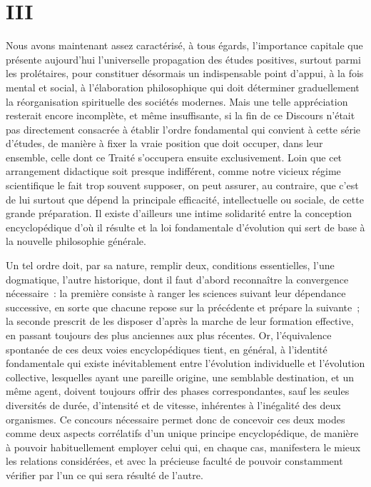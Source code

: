 \documentclass[french,twoside]{book} %
\begin{document}
\section[{III}]{III}
\label{discours\_3}\renewcommand{\leftmark}{III}

\noindent Nous avons maintenant assez caractérisé, à tous égards, l’importance capitale que présente aujourd’hui l’universelle propagation des études positives, surtout parmi les prolétaires, pour constituer désormais un indispensable point d’appui, à la fois mental et social, à l’élaboration philosophique qui doit déterminer graduellement la réorganisation spirituelle des sociétés modernes. Mais une telle appréciation resterait encore incomplète, et même insuffisante, si la fin de ce Discours n’était pas directement consacrée à établir l’ordre fondamental qui convient à cette série d’études, de manière à fixer la vraie position que doit occuper, dans leur ensemble, celle dont ce Traité s’occupera ensuite exclusivement. Loin que cet arrangement didactique soit presque indifférent, comme notre vicieux régime scientifique le fait trop souvent supposer, on peut assurer, au contraire, que c’est de lui surtout que dépend la principale efficacité, intellectuelle ou sociale, de cette grande préparation. Il existe d’ailleurs une intime solidarité entre la conception encyclopédique d’où il résulte et la loi fondamentale d’évolution qui sert de base à la nouvelle philosophie générale.\par
Un tel ordre doit, par sa nature, remplir deux, conditions essentielles, l’une dogmatique, l’autre historique, dont il faut d’abord reconnaître la convergence nécessaire : la première consiste à ranger les sciences suivant leur dépendance successive, en sorte que chacune repose sur la précédente et prépare la suivante ; la seconde prescrit de les disposer d’après la marche de leur formation effective, en passant toujours des plus anciennes aux plus récentes. Or, l’équivalence spontanée de ces deux voies encyclopédiques tient, en général, à l’identité fondamentale qui existe inévitablement entre l’évolution individuelle et l’évolution collective, lesquelles ayant une pareille origine, une semblable destination, et un même agent, doivent toujours offrir des phases correspondantes, sauf les seules diversités de durée, d’intensité et de vitesse, inhérentes à l’inégalité des deux organismes. Ce concours nécessaire permet donc de concevoir ces deux modes comme deux aspects corrélatifs d’un unique principe encyclopédique, de manière à pouvoir habituellement employer celui qui, en chaque cas, manifestera le mieux les relations considérées, et avec la précieuse faculté de pouvoir constamment vérifier par l’un ce qui sera résulté de l’autre.\par
\end{document}
